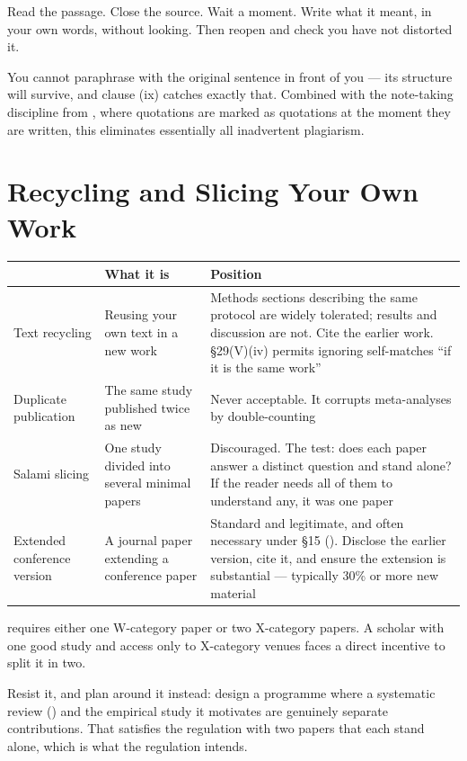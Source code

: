\begin{alertbox}
Read the passage. Close the source. Wait a moment. Write what it meant, in your
own words, without looking. Then reopen and check you have not distorted it.

\medskip
You cannot paraphrase with the original sentence in front of you --- its
structure will survive, and clause (ix) catches exactly that. Combined with the
note-taking discipline from , where quotations are marked as
quotations at the moment they are written, this eliminates essentially all
inadvertent plagiarism.
\end{alertbox}

\section{Recycling and Slicing Your Own Work}

\begin{center}
\small
\begin{tabular}{@{}L{3.2cm}L{5.2cm}L{5.7cm}@{}}
\toprule
 & \textbf{What it is} & \textbf{Position} \\
\midrule
Text recycling
  & Reusing your own text in a new work
  & Methods sections describing the same protocol are widely tolerated; results
    and discussion are not. Cite the earlier work. \S29(V)(iv) permits
    ignoring self-matches ``if it is the same work'' \\
Duplicate publication
  & The same study published twice as new
  & Never acceptable. It corrupts meta-analyses by double-counting \\
Salami slicing
  & One study divided into several minimal papers
  & Discouraged. The test: does each paper answer a distinct question and stand
    alone? If the reader needs all of them to understand any, it was one paper \\
Extended conference version
  & A journal paper extending a conference paper
  & Standard and legitimate, and often necessary under \S15
    (). Disclose the earlier version, cite it, and ensure
    the extension is substantial --- typically 30\% or more new material \\
\bottomrule
\end{tabular}
\end{center}

\begin{conceptbox}
 requires either one W-category paper or two
X-category papers. A scholar with one good study and access only to X-category
venues faces a direct incentive to split it in two.

\medskip
Resist it, and plan around it instead: design a programme where a systematic
review () and the empirical study it motivates are genuinely
separate contributions. That satisfies the regulation with two papers that each
stand alone, which is what the regulation intends.
\end{conceptbox}

